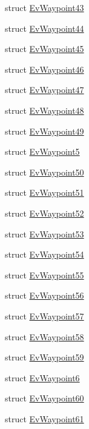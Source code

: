 \begin{DoxyCompactItemize}
\item 
struct \hyperlink{structmove__base__z__client_1_1EvWaypoint43}{Ev\+Waypoint43}
\item 
struct \hyperlink{structmove__base__z__client_1_1EvWaypoint44}{Ev\+Waypoint44}
\item 
struct \hyperlink{structmove__base__z__client_1_1EvWaypoint45}{Ev\+Waypoint45}
\item 
struct \hyperlink{structmove__base__z__client_1_1EvWaypoint46}{Ev\+Waypoint46}
\item 
struct \hyperlink{structmove__base__z__client_1_1EvWaypoint47}{Ev\+Waypoint47}
\item 
struct \hyperlink{structmove__base__z__client_1_1EvWaypoint48}{Ev\+Waypoint48}
\item 
struct \hyperlink{structmove__base__z__client_1_1EvWaypoint49}{Ev\+Waypoint49}
\item 
struct \hyperlink{structmove__base__z__client_1_1EvWaypoint5}{Ev\+Waypoint5}
\item 
struct \hyperlink{structmove__base__z__client_1_1EvWaypoint50}{Ev\+Waypoint50}
\item 
struct \hyperlink{structmove__base__z__client_1_1EvWaypoint51}{Ev\+Waypoint51}
\item 
struct \hyperlink{structmove__base__z__client_1_1EvWaypoint52}{Ev\+Waypoint52}
\item 
struct \hyperlink{structmove__base__z__client_1_1EvWaypoint53}{Ev\+Waypoint53}
\item 
struct \hyperlink{structmove__base__z__client_1_1EvWaypoint54}{Ev\+Waypoint54}
\item 
struct \hyperlink{structmove__base__z__client_1_1EvWaypoint55}{Ev\+Waypoint55}
\item 
struct \hyperlink{structmove__base__z__client_1_1EvWaypoint56}{Ev\+Waypoint56}
\item 
struct \hyperlink{structmove__base__z__client_1_1EvWaypoint57}{Ev\+Waypoint57}
\item 
struct \hyperlink{structmove__base__z__client_1_1EvWaypoint58}{Ev\+Waypoint58}
\item 
struct \hyperlink{structmove__base__z__client_1_1EvWaypoint59}{Ev\+Waypoint59}
\item 
struct \hyperlink{structmove__base__z__client_1_1EvWaypoint6}{Ev\+Waypoint6}
\item 
struct \hyperlink{structmove__base__z__client_1_1EvWaypoint60}{Ev\+Waypoint60}
\item 
struct \hyperlink{structmove__base__z__client_1_1EvWaypoint61}{Ev\+Waypoint61}

\end{DoxyCompactItemize}

